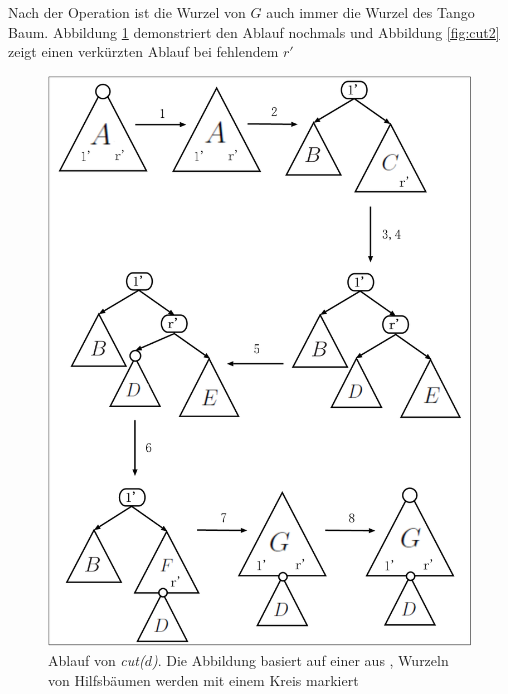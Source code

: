 \documentclass[a4paper,12pt]{article}
\begin{document}
Nach der Operation ist die Wurzel von $G$ auch immer die Wurzel des Tango Baum. Abbildung \ref{fig:cut} demonstriert den Ablauf nochmals und Abbildung \ref{fig:cut2} zeigt einen verkürzten Ablauf bei fehlendem $r'$
\begin{figure}[H]
	\centering
	\includegraphics[width=1\textwidth]{"Medien/Tango/cut"}
	\caption{Ablauf von \textit{cut($d$)}. Die Abbildung basiert auf einer aus \cite{demainDinamicOpti}, Wurzeln von Hilfsbäumen werden mit einem Kreis markiert }
	\label{fig:cut}
\end{figure}
\end{document}
